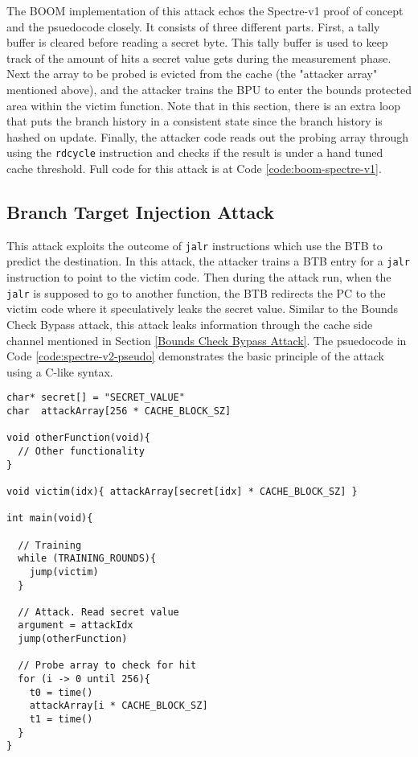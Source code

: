 
The BOOM implementation of this attack echos the Spectre-v1 proof of concept and the psuedocode closely.
It consists of three different parts. First, a tally buffer is cleared before reading a secret byte.
This tally buffer is used to keep track of the amount of hits a secret value gets during the measurement
phase. Next the array to be probed is evicted from the cache (the "attacker array" mentioned above), and
the attacker trains the BPU to enter the bounds protected area within the victim function. Note that in
this section, there is an extra loop that puts the branch history in a consistent state since the branch
history is hashed on update. Finally, the attacker code reads out the probing array through using the
{\tt rdcycle} instruction and checks if the result is under a hand tuned cache threshold. Full code for 
this attack is at Code \ref{code:boom-spectre-v1}.

\subsection{Branch Target Injection Attack}

This attack exploits the outcome
of {\tt jalr} instructions which use the BTB to predict the destination. In this attack,
the attacker trains a BTB entry for a {\tt jalr} instruction to point to 
the victim code. Then during the attack run, when the {\tt jalr} is supposed to go to another function,
the BTB redirects the PC to the victim code where it speculatively leaks the secret value. Similar to the
Bounds Check Bypass attack, this attack leaks information through the
cache side channel mentioned in Section \ref{Bounds Check Bypass Attack}. The psuedocode in 
Code \ref{code:spectre-v2-pseudo} demonstrates the basic principle of the attack using a C-like syntax.

\begin{lstlisting}[style=column-code, label={code:spectre-v2-pseudo}, caption=Psuedocode of Bounds Check Bypass Attack]
char* secret[] = "SECRET_VALUE"
char  attackArray[256 * CACHE_BLOCK_SZ]

void otherFunction(void){
  // Other functionality    
}

void victim(idx){ attackArray[secret[idx] * CACHE_BLOCK_SZ] }

int main(void){
  
  // Training
  while (TRAINING_ROUNDS){
    jump(victim)
  }

  // Attack. Read secret value
  argument = attackIdx
  jump(otherFunction)

  // Probe array to check for hit
  for (i -> 0 until 256){
    t0 = time()
    attackArray[i * CACHE_BLOCK_SZ]
    t1 = time()
  }
}
\end{lstlisting}

